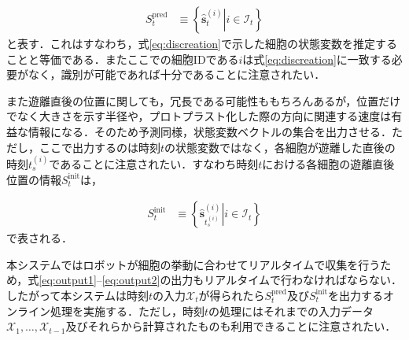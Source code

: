 \begin{equation}
    \label{eq:output1}
    \begin{aligned}
        S^{\text{pred}}_t &\equiv \left\{ \left. \hat{\bm{s}}_t^{(i)}\right| i \in \mathcal{I}_t\right\}
    \end{aligned}
\end{equation}
と表す．これはすなわち，式\ref{eq:discreation}で示した細胞の状態変数を推定することと等価である．またここでの細胞IDである$i$は式\ref{eq:discreation}に一致する必要がなく，識別が可能であれば十分であることに注意されたい．
\par
また遊離直後の位置に関しても，冗長である可能性ももちろんあるが，位置だけでなく大きさを示す半径や，プロトプラスト化した際の方向に関連する速度は有益な情報になる．そのため予測同様，状態変数ベクトルの集合を出力させる．ただし，ここで出力するのは時刻$t$の状態変数ではなく，各細胞が遊離した直後の時刻$t_s^{(i)}$であることに注意されたい．すなわち時刻$t$における各細胞の遊離直後位置の情報$S^{\text{init}}_t$は，

\begin{equation}
    \label{eq:output2}
    \begin{aligned}
        S^{\text{init}}_t &\equiv \left\{ \left. \hat{\bm{s}}_{t_s^{(i)}}^{(i)}\right| i \in \mathcal{I}_t\right\}
    \end{aligned}
\end{equation}
で表される．

\par
本システムではロボットが細胞の挙動に合わせてリアルタイムで収集を行うため，式\ref{eq:output1}--\ref{eq:output2}の出力もリアルタイムで行わなければならない．したがって本システムは時刻$t$の入力$\mathcal{X}_t$が得られたら$S_t^{\text{pred}}$及び$S_t^{\text{init}}$を出力するオンライン処理を実施する．ただし，時刻$t$の処理にはそれまでの入力データ$\mathcal{X}_1, \dots, \mathcal{X}_{t-1}$及びそれらから計算されたものも利用できることに注意されたい．

